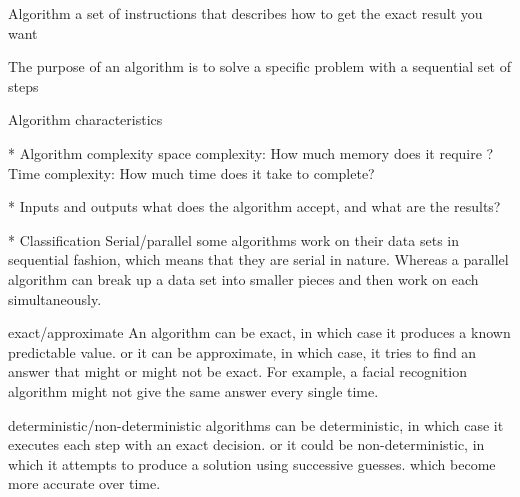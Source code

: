 Algorithm 
  a set of instructions that describes how to get the exact result you want

The purpose of an algorithm is 
  to solve a specific problem with a sequential set of steps

Algorithm  characteristics 

* Algorithm complexity 
    space complexity: How much memory does it require ?
    Time complexity: How much time does it take to complete?


* Inputs and outputs 
    what does the algorithm accept, and what are the results?


* Classification
    Serial/parallel
        some algorithms work on their data sets in sequential fashion, which means that they are serial in nature. 
        Whereas a parallel algorithm can break up a data set into smaller pieces and then work on each simultaneously.

    exact/approximate
        An algorithm can be exact, in which case it produces a known predictable value.
        or it can be approximate, in which case, it tries to find an answer that might or might not be exact. 
        For example, a facial recognition algorithm might not give the same answer every single time. 

    deterministic/non-deterministic 
        algorithms can be deterministic, in which case it executes each step with an exact decision.
        or it could be non-deterministic, in which it attempts to produce a solution using successive guesses.
         which become more accurate over time.
